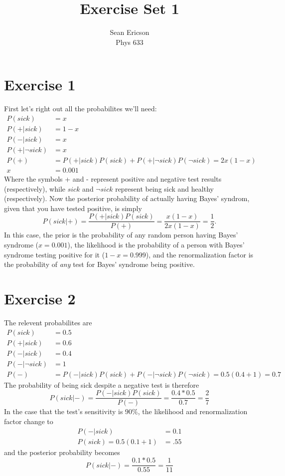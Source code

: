 \documentclass[12pt]{article}
\begin{document}
	
\title{Exercise Set 1}
\author{Sean Ericson \\ Phys 633}
\maketitle

\section*{Exercise 1}
First let's right out all the probabilites we'll need:
\begin{align*}
    P(sick) &= x \\
    P(+|sick) &= 1-x \\
    P(-|sick) &= x \\
    P(+|\neg sick) &= x \\
    P(+) &= P(+|sick)P(sick) + P(+|\neg sick)P(\neg sick) = 2x(1-x) \\
    x &= 0.001
\end{align*}
Where the symbols + and - represent positive and negative test results (respectively), while $sick$ and $\neg sick$ represent being sick and healthy (respectively). Now the posterior probability of actually having Bayes' syndrom, given that you have tested positive, is simply
\[ P(sick|+) = \frac{P(+|sick)P(sick)}{P(+)} = \frac{x(1-x)}{2x(1-x)} = \frac{1}{2}. \]
In this case, the prior is the probability of any random person having Bayes' syndrome ($x=0.001$), the likelihood is the probability of a person with Bayes' syndrome testing positive for it ($1-x=0.999$), and the renormalization factor is the probability of \textit{any} test for Bayes' syndrome being positive.

\section*{Exercise 2}
The relevent probabilites are
\begin{align*}
    P(sick) &= 0.5 \\
    P(+|sick) &= 0.6 \\
    P(-|sick) &= 0.4 \\
    P(-|\neg sick) &= 1 \\
    P(-) &= P(-|sick)P(sick) + P(-|\neg sick)P(\neg sick) = 0.5(0.4 + 1) = 0.7
\end{align*}
The probability of being sick despite a negative test is therefore
\[ P(sick|-) = \frac{P(-|sick)P(sick)}{P(-)} = \frac{0.4*0.5}{0.7} = \frac{2}{7} \] 
In the case that the test's sensitivity is $90\%$, the likelihood and renormalization factor change to
\begin{align*}
    P(-|sick) &= 0.1 \\
    P(sick) = 0.5(0.1 + 1) &= .55
\end{align*}
and the posterior probability becomes
\[ P(sick|-) = \frac{0.1 * 0.5}{0.55} = \frac{1}{11} \]
\end{document}

